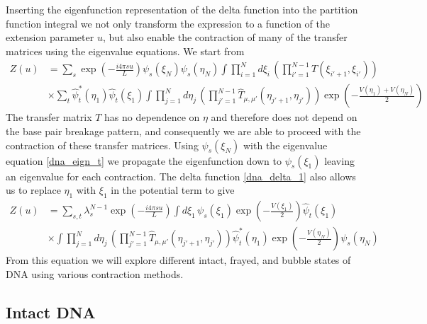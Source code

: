 Inserting the eigenfunction representation of the delta function into the partition function integral we not only transform the expression to a function of the extension parameter $u$, but also enable the contraction of many of the transfer matrices using the eigenvalue equations. We start from
%
\begin{align}
Z\left(u\right)&=\sum_{s}\exp\left(-\frac{i4\pi s u}{L}\right)\psi_{s}\left(\xi_{N}\right)\psi_{s}\left(\eta_{N}\right)\int \prod_{i=1}^{N}d\xi_{i}\,\left(\prod_{i'=1}^{N-1}T\left(\xi_{i'+1},\xi_{i'}\right)\right)\nonumber\\
&\times\sum_{t}\hat{\psi}^{*}_{t}\left(\eta_{1}\right)\hat{\psi}_{t}\left(\xi_{1}\right)\int \prod_{j=1}^{N}d\eta_{j}\,\left(\prod_{j'=1}^{N-1}\hat{T}_{\mu,\mu'}\left(\eta_{j'+1},\eta_{j'}\right)\right)\exp\left(-\frac{V\left(\eta_{1}\right)+V\left(\eta_{N}\right)}{2}\right)
\end{align}
%
The transfer matrix $T$ has no dependence on $\eta$ and therefore does not depend on the base pair breakage pattern, and consequently we are able to proceed with the contraction of these transfer matrices. Using $\psi_{s}\left(\xi_{N}\right)$ with the eigenvalue equation \eqref{dna_eign_t} we propagate the eigenfunction  down to $\psi_{s}\left(\xi_{1}\right)$ leaving an eigenvalue for each contraction. The delta function \eqref{dna_delta_1} also allows us to replace $\eta_1$ with $\xi_1$ in the potential term to give
%
\begin{align}
\label{dna_z_eta}
Z\left(u\right)&=\sum_{s,t}\lambda_{s}^{N-1}\exp\left(-\frac{i4\pi s u}{L}\right)\int d\xi_{1}\,\psi_{s}\left(\xi_{1}\right)\exp\left(-\frac{V\left(\xi_{1}\right)}{2}\right)\hat{\psi}_{t}\left(\xi_{1}\right)\\
&\times\int \prod_{j=1}^{N}d\eta_{j}\,\left(\prod_{j'=1}^{N-1}\hat{T}_{\mu,\mu'}\left(\eta_{j'+1},\eta_{j'}\right)\right)\hat{\psi}^{*}_{t}\left(\eta_{1}\right)\exp\left(-\frac{V\left(\eta_{N}\right)}{2}\right)\psi_{s}\left(\eta_{N}\right)\nonumber
\end{align}
%
From this equation we will explore different intact, frayed, and bubble states of DNA using various contraction methods. 

\subsection{Intact DNA}

